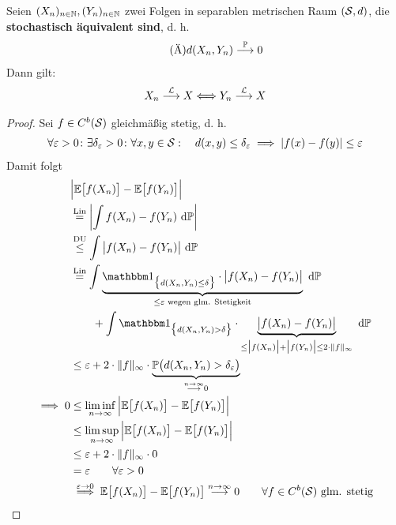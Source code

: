 \begin{satz}[Cramér]\enter\label{satz4.14Cramer}
Seien $(X_n)_{n\in\N},(Y_n)_{n\in\N}$ zwei Folgen in separablen metrischen Raum $(\S,d)$, die \textbf{stochastisch äquivalent sind}, d. h.
\begin{align}\label{eq4.14StochastischAquivalent}\tag{Ä}
d(X_n,Y_n)\stackrel{\P}{\longrightarrow}0
\end{align}
Dann gilt:
\begin{align*}
X_n\stackrel{\L}{\longrightarrow} X\Longleftrightarrow Y_n\stackrel{\L}{\longrightarrow} X
\end{align*}
\end{satz}
\begin{proof}
Sei $f\in C^b(\S)$ gleichmäßig stetig, d. h.
\begin{align*}
    \forall\varepsilon>0\colon
        \exists\delta_\varepsilon>0\colon
        \forall x,y\in\S:\quad
        d(x,y) \leq \delta_\varepsilon \implies \left|f(x)-f(y)\right| \leq \varepsilon
\end{align*}
Damit folgt
\begin{align*}
&\Big|\E\big[f(X_n)\big]-\E\big[f(Y_n)\big]\Big|\\
&\stackeq{\text{Lin}}
\left|\int\limits f(X_n)-f(Y_n)\d\P\right|\\
&\stackrel{\text{DU}}{\leq}
\int\limits\big|f(X_n)-f(Y_n)\big|\d\P\\
&\stackeq{\text{Lin}}
\int\limits\underbrace{\indi_{\big\lbrace d(X_n,Y_n)\leq\delta\big\rbrace}\cdot\big|f(X_n)-f(Y_n)\big|}_{\leq\varepsilon\text{ wegen glm. Stetigkeit}}\d\P\\
&\qquad+
\int\limits\indi_{\big\lbrace d(X_n,Y_n)>\delta\big\rbrace}\cdot\underbrace{\big|f(X_n)-f(Y_n)\big|}_{\leq\big|f(X_n)\big|+\big|f(Y_n)\big|\leq2\cdot\Vert f\Vert_\infty}\d\P\\
&\leq\varepsilon+2\cdot\Vert f\Vert_\infty\cdot\underbrace{\P\big(d(X_n,Y_n)>\delta_\varepsilon\big)}_{\stackrel{n\to\infty}{\longrightarrow}0}\\
\implies
0&\leq\liminf\limits_{n\to\infty}\Big|\E\big[f(X_n)\big]-\E\big[f(Y_n)\big]\Big|\\
&\leq\limsup\limits_{n\to\infty}\Big|\E\big[f(X_n)\big]-\E\big[f(Y_n)\big]\Big|\\
&\leq\varepsilon+2\cdot\Vert f\Vert_\infty\cdot 0\\
&=\varepsilon\qquad\forall\varepsilon>0\\
&\stackrel{\varepsilon\to0}{\implies}
\E\big[f(X_n)\big]-\E\big[f(Y_n)\big]\stackrel{n\to\infty}{\longrightarrow} 0\qquad\forall f\in C^b(\S)\text{ glm. stetig}

\end{align*}
\end{proof}

